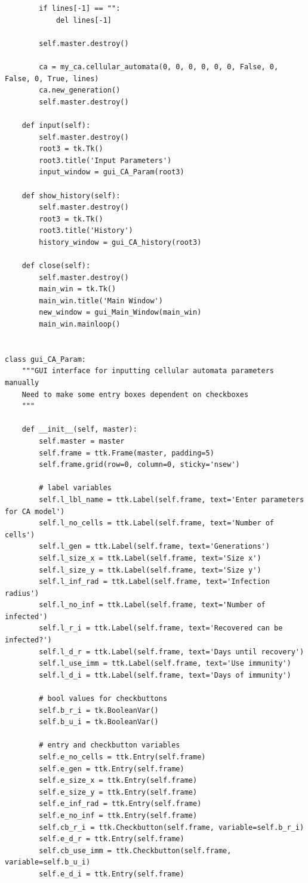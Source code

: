 \documentclass[11pt, a4paper]{article}
\begin{document}
\begin{lstlisting}
        if lines[-1] == "":
            del lines[-1]

        self.master.destroy()

        ca = my_ca.cellular_automata(0, 0, 0, 0, 0, 0, False, 0, False, 0, True, lines)
        ca.new_generation()
        self.master.destroy()

    def input(self):
        self.master.destroy()
        root3 = tk.Tk()
        root3.title('Input Parameters')
        input_window = gui_CA_Param(root3)

    def show_history(self):
        self.master.destroy()
        root3 = tk.Tk()
        root3.title('History')
        history_window = gui_CA_history(root3)

    def close(self):
        self.master.destroy()
        main_win = tk.Tk()
        main_win.title('Main Window')
        new_window = gui_Main_Window(main_win)
        main_win.mainloop()


class gui_CA_Param:
    """GUI interface for inputting cellular automata parameters manually
    Need to make some entry boxes dependent on checkboxes
    """

    def __init__(self, master):
        self.master = master
        self.frame = ttk.Frame(master, padding=5)
        self.frame.grid(row=0, column=0, sticky='nsew')

        # label variables
        self.l_lbl_name = ttk.Label(self.frame, text='Enter parameters for CA model')
        self.l_no_cells = ttk.Label(self.frame, text='Number of cells')
        self.l_gen = ttk.Label(self.frame, text='Generations')
        self.l_size_x = ttk.Label(self.frame, text='Size x')
        self.l_size_y = ttk.Label(self.frame, text='Size y')
        self.l_inf_rad = ttk.Label(self.frame, text='Infection radius')
        self.l_no_inf = ttk.Label(self.frame, text='Number of infected')
        self.l_r_i = ttk.Label(self.frame, text='Recovered can be infected?')
        self.l_d_r = ttk.Label(self.frame, text='Days until recovery')
        self.l_use_imm = ttk.Label(self.frame, text='Use immunity')
        self.l_d_i = ttk.Label(self.frame, text='Days of immunity')

        # bool values for checkbuttons
        self.b_r_i = tk.BooleanVar()
        self.b_u_i = tk.BooleanVar()

        # entry and checkbutton variables
        self.e_no_cells = ttk.Entry(self.frame)
        self.e_gen = ttk.Entry(self.frame)
        self.e_size_x = ttk.Entry(self.frame)
        self.e_size_y = ttk.Entry(self.frame)
        self.e_inf_rad = ttk.Entry(self.frame)
        self.e_no_inf = ttk.Entry(self.frame)
        self.cb_r_i = ttk.Checkbutton(self.frame, variable=self.b_r_i)
        self.e_d_r = ttk.Entry(self.frame)
        self.cb_use_imm = ttk.Checkbutton(self.frame, variable=self.b_u_i)
        self.e_d_i = ttk.Entry(self.frame)


\end{lstlisting}
\end{document}
